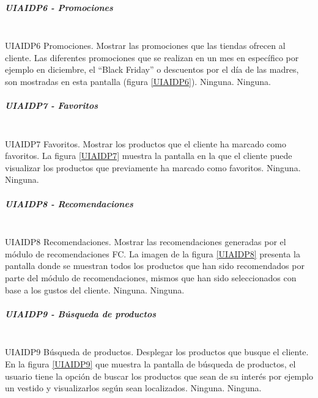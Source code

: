 \subparagraph{UIAIDP6 - Promociones} ~\\
\FloatBarrier
{} %
{UIAIDP6} %
{Promociones.}  %
{Mostrar las promociones que las tiendas ofrecen al cliente.} %
{Las diferentes promociones que se realizan en un mes en específico por ejemplo en diciembre, el ``Black Friday'' o descuentos por el día de las madres, son mostradas en esta pantalla (figura \ref{UIAIDP6}).} %
{Ninguna.} %
{Ninguna.} %
\FloatBarrier

\subparagraph{UIAIDP7 - Favoritos} ~\\
\FloatBarrier
{} %
{UIAIDP7} %
{Favoritos.}  %
{Mostrar los productos que el cliente ha marcado como favoritos.} %
{La figura \ref{UIAIDP7} muestra la  pantalla en la que el cliente puede visualizar los productos que previamente ha marcado como favoritos.} %
{Ninguna.} %
{Ninguna.} %
\FloatBarrier

\subparagraph{UIAIDP8 - Recomendaciones} ~\\
\FloatBarrier
{} %
{UIAIDP8} %
{Recomendaciones.}  %
{Mostrar las recomendaciones generadas por el módulo de recomendaciones FC.} %
{La imagen de la figura \ref{UIAIDP8} presenta la pantalla donde se muestran todos los productos que han sido recomendados por parte del módulo de recomendaciones, mismos que han sido seleccionados con base a los gustos del cliente.} %
{Ninguna.} %
{Ninguna.} %
\FloatBarrier

\subparagraph{UIAIDP9 - Búsqueda de productos} ~\\
\FloatBarrier
{} %
{UIAIDP9} %
{Búsqueda de productos.}  %
{Desplegar los productos que busque el cliente.} %
{En la figura \ref{UIAIDP9} que muestra la pantalla  de búsqueda de productos, el usuario tiene la opción de buscar los productos que sean de su interés por ejemplo un vestido y visualizarlos según sean localizados.} %
{Ninguna.} %
{Ninguna.} %
\FloatBarrier

